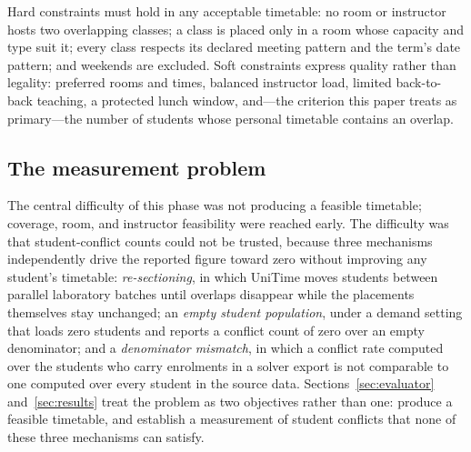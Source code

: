 \documentclass[journal]{IEEEtran}
\begin{document}
Hard constraints must hold in any acceptable timetable: no room or instructor hosts two overlapping classes; a class is placed only in a room whose capacity and type suit it; every class respects its declared meeting pattern and the term's date pattern; and weekends are excluded. Soft constraints express quality rather than legality: preferred rooms and times, balanced instructor load, limited back-to-back teaching, a protected lunch window, and---the criterion this paper treats as primary---the number of students whose personal timetable contains an overlap.

\subsection{The measurement problem}
\label{sec:measurement-problem}
The central difficulty of this phase was not producing a feasible timetable; coverage, room, and instructor feasibility were reached early. The difficulty was that student-conflict counts could not be trusted, because three mechanisms independently drive the reported figure toward zero without improving any student's timetable: \emph{re-sectioning}, in which UniTime moves students between parallel laboratory batches until overlaps disappear while the placements themselves stay unchanged; an \emph{empty student population}, under a demand setting that loads zero students and reports a conflict count of zero over an empty denominator; and a \emph{denominator mismatch}, in which a conflict rate computed over the students who carry enrolments in a solver export is not comparable to one computed over every student in the source data. Sections~\ref{sec:evaluator} and~\ref{sec:results} treat the problem as two objectives rather than one: produce a feasible timetable, and establish a measurement of student conflicts that none of these three mechanisms can satisfy.
\end{document}
